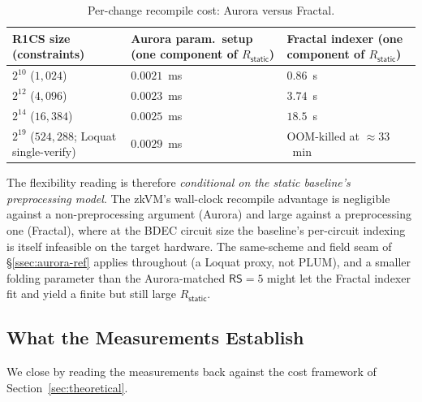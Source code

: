 \begin{table}[H]
\centering
\small
\begin{tabularx}{\textwidth}{@{}l Y Y@{}}
\toprule
R1CS size (constraints) & Aurora param.\ setup (one component of $R_{\mathsf{static}}$) & Fractal indexer (one component of $R_{\mathsf{static}}$) \\
\midrule
$2^{10}$ ($1{,}024$)          & $0.0021$~ms & $0.86$~s \\
$2^{12}$ ($4{,}096$)          & $0.0023$~ms & $3.74$~s \\
$2^{14}$ ($16{,}384$)         & $0.0025$~ms & $18.5$~s \\
$2^{19}$ ($524{,}288$; Loquat single-verify) & $0.0029$~ms & OOM-killed at ${\approx}33$~min \\
\bottomrule
\end{tabularx}
\caption{Per-change recompile cost: Aurora versus Fractal.}
\label{tab:rstatic-fractal}
\end{table}

\noindent The flexibility reading is therefore \emph{conditional on the static baseline's preprocessing model}. The zkVM's wall-clock recompile advantage is negligible against a non-preprocessing argument (Aurora) and large against a preprocessing one (Fractal), where at the BDEC circuit size the baseline's per-circuit indexing is itself infeasible on the target hardware. The same-scheme and field seam of \S\ref{ssec:aurora-ref} applies throughout (a Loquat proxy, not PLUM), and a smaller folding parameter than the Aurora-matched $\mathsf{RS}=5$ might let the Fractal indexer fit and yield a finite but still large $R_{\mathsf{static}}$.

\subsection{What the Measurements Establish}\label{ssec:scorecard}
We close by reading the measurements back against the cost framework of Section~\ref{sec:theoretical}.

